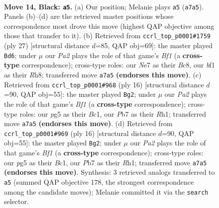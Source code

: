 \documentclass[11pt]{article}
\begin{document}
\begin{figure}[p]\centering
\begin{subfigure}{0.46\textwidth}\centering
\resizebox{\linewidth}{!}{%
\newchessgame
\chessboard[
  setfen={rnb1r3/pp1qnpkp/4p3/2PpP1P1/5P2/P1P5/2P5/R1BQKBNR b KQ - 0 14},
  showmover=false,
  pgfstyle=straightmove, color=movearrow, markmove={a7-a5}
]}
\caption{}
\end{subfigure}\hfill
\begin{subfigure}{0.46\textwidth}\centering
\resizebox{\linewidth}{!}{%
\newchessgame
\chessboard[
  setfen={r1b1kb1r/pp4pp/4pqn1/5p2/3p1P2/3P1BP1/PP1NQ2P/R1B1K2R b KQkq - 2 14},
  showmover=false,
  pgfstyle=straightmove, color=movearrow, markmove={f8-d6}
]}
\caption{}
\end{subfigure}
\\[4pt]
\begin{subfigure}{0.46\textwidth}\centering
\resizebox{\linewidth}{!}{%
\newchessgame
\chessboard[
  setfen={rn1qkb1r/pp3p2/2p1pp2/5b1p/3P4/2P2NP1/PP3P1P/R1BQKB1R w KQkq - 0 9},
  showmover=false,
  pgfstyle=straightmove, color=movearrow, markmove={f1-g2}
]}
\caption{}
\end{subfigure}\hfill
\begin{subfigure}{0.46\textwidth}\centering
\resizebox{\linewidth}{!}{%
\newchessgame
\chessboard[
  setfen={rn1qkb1r/pp3p2/2p1pp2/5b1p/3P4/2P2NP1/PP3P1P/R1BQKB1R w KQkq - 0 9},
  showmover=false,
  pgfstyle=straightmove, color=movearrow, markmove={f1-g2}
]}
\caption{}
\end{subfigure}
\caption{\textbf{Move 14, Black: \texttt{a5}.} (a) Our position; Melanie plays \texttt{a5} (\texttt{a7a5}). Panels (b)--(d) are the retrieved master positions whose correspondence most drove this move (highest QAP objective among those that transfer to it). (b) Retrieved from \texttt{ccrl\_top\_p0001\#1759} (ply 27) [structural distance $d$=85, QAP obj=69]: the master played \texttt{Bd6}; under $\mu$ our \emph{Pa2} plays the role of that game's \emph{Bf1} (a \textbf{cross-type} correspondence); cross-type roles: our \emph{N}e7 as their \emph{B}c8, our \emph{b}f1 as their \emph{R}h8; transferred move \texttt{a7a5} \textbf{(endorses this move)}. (c) Retrieved from \texttt{ccrl\_top\_p0001\#968} (ply 16) [structural distance $d$=90, QAP obj=55]: the master played \texttt{Bg2}; under $\mu$ our \emph{Pa2} plays the role of that game's \emph{Bf1} (a \textbf{cross-type} correspondence); cross-type roles: our \emph{p}g5 as their \emph{B}c1, our \emph{P}b7 as their \emph{R}h1; transferred move \texttt{a7a5} \textbf{(endorses this move)}. (d) Retrieved from \texttt{ccrl\_top\_p0001\#969} (ply 16) [structural distance $d$=90, QAP obj=55]: the master played \texttt{Bg2}; under $\mu$ our \emph{Pa2} plays the role of that game's \emph{Bf1} (a \textbf{cross-type} correspondence); cross-type roles: our \emph{p}g5 as their \emph{B}c1, our \emph{P}b7 as their \emph{R}h1; transferred move \texttt{a7a5} \textbf{(endorses this move)}. Synthesis: 3 retrieved analogs transferred to \texttt{a5} (summed QAP objective 178, the strongest correspondence among the candidate moves); Melanie committed it via the \texttt{search} selector.}
\label{fig:thought-m27}
\end{figure}
\end{document}

